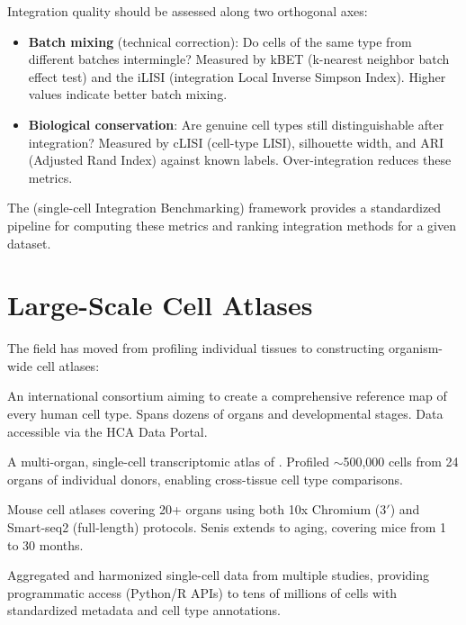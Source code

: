 \begin{keyconcept}[title={Metrics for Evaluating Integration Quality}]
Integration quality should be assessed along two orthogonal axes:
\begin{itemize}[nosep]
  \item \textbf{Batch mixing} (technical correction): Do cells of the same type
    from different batches intermingle? Measured by kBET (k-nearest neighbor
    batch effect test) and the iLISI (integration Local Inverse Simpson Index).
    Higher values indicate better batch mixing.
  \item \textbf{Biological conservation}: Are genuine cell types still
    distinguishable after integration? Measured by cLISI (cell-type LISI),
    silhouette width, and ARI (Adjusted Rand Index) against known labels.
    Over-integration reduces these metrics.
\end{itemize}
The  (single-cell Integration Benchmarking) framework provides a
standardized pipeline for computing these metrics and ranking integration methods
for a given dataset.
\end{keyconcept}


\section{Large-Scale Cell Atlases}
\label{sec:scrnaseq:atlases}

The field has moved from profiling individual tissues to constructing
organism-wide cell atlases:

\begin{description}[style=nextline]
  \item[Human Cell Atlas (HCA)] An international consortium aiming to create a
    comprehensive reference map of every human cell type. Spans dozens of organs
    and developmental stages. Data accessible via the HCA Data Portal.
  \item[Tabula Sapiens] A multi-organ, single-cell transcriptomic atlas of
    . Profiled $\sim$500,000 cells from 24 organs of
    individual donors, enabling cross-tissue cell type comparisons.
  \item[Tabula Muris / Tabula Muris Senis] Mouse cell atlases covering 20+
    organs using both 10x Chromium (3$'$) and Smart-seq2 (full-length) protocols.
    Senis extends to aging, covering mice from 1 to 30 months.
  \item[CellxGene Census] Aggregated and harmonized single-cell data from
    multiple studies, providing programmatic access (Python/R APIs) to tens
    of millions of cells with standardized metadata and cell type annotations.
\end{description}


